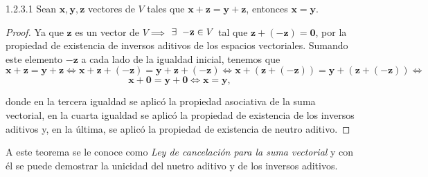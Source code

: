\documentclass[apuntes]{subfiles}
\begin{document}
\begin{teorema} {1.2.3.1}
Sean $\mathbf{x},\mathbf{y},\mathbf{z}$ vectores de $V$ tales que $\mathbf{x}+\mathbf{z}=\mathbf{y}+\mathbf{z}$, entonces $\mathbf{x}=\mathbf{y}$.

\begin{proof}
Ya que $\mathbf{z}$ es un vector de $V\implies$ $\exists\hspace{2mm} \mathbf{-z}\in V$ tal que $\mathbf{z} + (-\mathbf{z}) = \mathbf{0}$, por la propiedad de existencia de inversos aditivos de los espacios vectoriales. Sumando este elemento $-\mathbf{z}$ a cada lado de la igualdad inicial, tenemos que $$\mathbf{x}+\mathbf{z}=\mathbf{y}+\mathbf{z}\iff\mathbf{x}+\mathbf{z}+ (-\mathbf{z})=\mathbf{y}+\mathbf{z}+ (-\mathbf{z})\iff\mathbf{x}+(\mathbf{z}+ (-\mathbf{z}))=\mathbf{y}+(\mathbf{z}+ (-\mathbf{z}))\iff$$ $$ \mathbf{x}+\mathbf{0}=\mathbf{y}+\mathbf{0}\iff\mathbf{x}=\mathbf{y},$$

\noindent donde en la tercera igualdad se aplicó la propiedad asociativa de la suma vectorial, en la cuarta igualdad se aplicó la propiedad de existencia de los inversos aditivos y, en la última, se aplicó la propiedad de existencia de neutro aditivo.
\end{proof}
A este teorema se le conoce como \emph{Ley de cancelación para la suma vectorial} y con él se puede demostrar la unicidad del nuetro aditivo y de los inversos aditivos.
\end{teorema}
\end{document}
